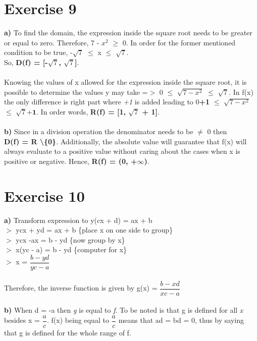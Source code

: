 \documentclass{article}
\begin{document}
  \section*{Exercise 9}
  \textbf{a)} To find the domain, the expression inside the square root needs to be greater or equal to zero. Therefore, 7 - $x^2$ $\geq$ 0. In order for the former mentioned condition to be true, -$\sqrt{7}$ $\leq$ x $\leq$ $\sqrt{7}$. \\
  So, \textbf{D(f) = [-$\sqrt{7}$, $\sqrt{7}$]}. \\ \\ 
  Knowing the values of x allowed for the expression inside the square root, it is possible to determine the values y may take =$>$ 0 $\leq$ $\sqrt{7 - x^2}$ $\leq$ $\sqrt{7}$. In f(x) the only difference is right part where \textit{+1} is added leading to 0\textbf{+1} $\leq$ $\sqrt{7 - x^2}$ $\leq$ $\sqrt{7} \textbf{+1}$. In order words, \textbf{R(f) = [1, $\sqrt{7}$ + 1]}. \\ \\
  \textbf{b)} Since in a division operation the denominator needs to be $\neq$ 0 then \\ \textbf{D(f) = R \textbackslash \{0\}}. Additionally, the absolute value will guarantee that f(x) will always evaluate to a positive value without caring about the cases when x is positive or negative. Hence, \textbf{R(f) = (0, +$\infty$)}.
  
  \section*{Exercise 10}
  \textbf{a)} Transform expression to y(cx + d) = ax + b \\
  $>$ ycx + yd = ax + b \{place x on one side to group\} \\ 
  $>$ ycx -ax = b - yd  \{now group by x\} \\
  $>$ x(yc - a) = b - yd \{computer for x\} \\
  $>$ x = $\dfrac{b-yd}{yc-a}$ \\ \\
  Therefore, the inverse function is given by g(x) = $\dfrac{b-xd}{xc-a}$ \\ \\
  \textbf{b)} When d = -a then \textit{g} is equal to \textit{f}. To be noted is that g is defined for all \textit{x} besides x = $\dfrac{a}{c}$. f(x) being equal to $\dfrac{a}{c}$ means that ad = bd = 0, thus by saying that g is defined for the whole range of f.
   
\end{document}
